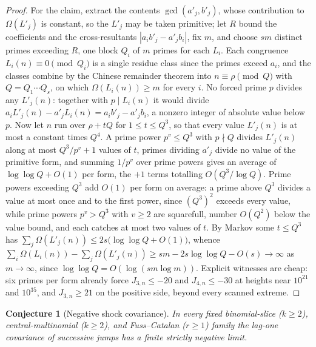 \documentclass[11pt]{article}
\newtheorem{conjecture}{Conjecture}
\theoremstyle{definition}
\begin{document}
\begin{proof}
For the claim, extract the contents $\gcd(a'_j,b'_j)$, whose contribution to $\Omega(L'_j)$ is constant, so the $L'_j$ may be taken primitive; let $R$ bound the coefficients and the cross-resultants $|a_ib'_j-a'_jb_i|$, fix $m$, and choose $sm$ distinct primes exceeding $R$, one block $Q_i$ of $m$ primes for each $L_i$.  Each congruence $L_i(n)\equiv0\pmod{Q_i}$ is a single residue class since the primes exceed $a_i$, and the classes combine by the Chinese remainder theorem into $n\equiv\rho\pmod Q$ with $Q=Q_1\cdots Q_s$, on which $\Omega(L_i(n))\ge m$ for every $i$.  No forced prime $p$ divides any $L'_j(n)$: together with $p\mid L_i(n)$ it would divide $a_iL'_j(n)-a'_jL_i(n)=a_ib'_j-a'_jb_i$, a nonzero integer of absolute value below $p$.  Now let $n$ run over $\rho+tQ$ for $1\le t\le Q^3$, so that every value $L'_j(n)$ is at most a constant times $Q^4$.  A prime power $p^v\le Q^3$ with $p\nmid Q$ divides $L'_j(n)$ along at most $Q^3/p^v+1$ values of $t$, primes dividing $a'_j$ divide no value of the primitive form, and summing $1/p^v$ over prime powers gives an average of $\log\log Q+O(1)$ per form, the $+1$ terms totalling $O(Q^3/\log Q)$.  Prime powers exceeding $Q^3$ add $O(1)$ per form on average: a prime above $Q^3$ divides a value at most once and to the first power, since $(Q^3)^2$ exceeds every value, while prime powers $p^v>Q^3$ with $v\ge2$ are squarefull, number $O(Q^2)$ below the value bound, and each catches at most two values of $t$.  By Markov some $t\le Q^3$ has $\sum_j\Omega(L'_j(n))\le2s\bigl(\log\log Q+O(1)\bigr)$, whence $\sum_i\Omega(L_i(n))-\sum_j\Omega(L'_j(n))\ge sm-2s\log\log Q-O(s)\to\infty$ as $m\to\infty$, since $\log\log Q=O(\log(sm\log m))$.  Explicit witnesses are cheap: six primes per form already force $J_{3,n}\le-20$ and $J_{4,n}\le-30$ at heights near $10^{21}$ and $10^{35}$, and $J_{3,n}\ge21$ on the positive side, beyond every scanned extreme.
\end{proof}

\begin{conjecture}[Negative shock covariance]\label{w17}
In every fixed binomial-slice ($k\ge2$), central-multinomial ($k\ge2$), and Fuss--Catalan ($r\ge1$) family the lag-one covariance of successive jumps has a finite strictly negative limit.
\end{conjecture}
\end{document}
